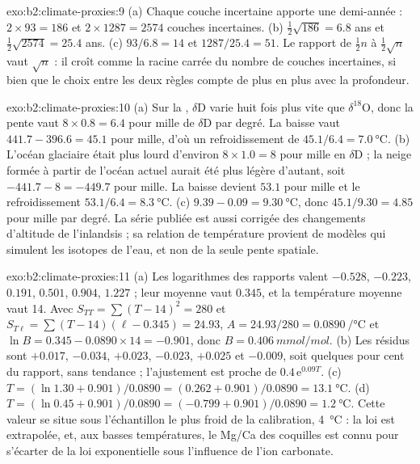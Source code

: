 \begin{solution}{exo:b2:climate-proxies:9}
(a) Chaque couche incertaine apporte une demi-année : $2 \times 93 = 186$ et $2 \times 1287 = 2574$
couches incertaines. (b) $\frac12\sqrt{186} = 6.8$ ans et $\frac12\sqrt{2574} = 25.4$ ans.
(c) $93/6.8 = 14$ et $1287/25.4 = 51$. Le rapport de $\frac12 n$ à $\frac12\sqrt{n}$ vaut
$\sqrt{n}$ : il croît comme la racine carrée du nombre de couches incertaines, si bien que le choix entre les deux règles
compte de plus en plus avec la profondeur.
\end{solution}

\begin{solution}{exo:b2:climate-proxies:10}
(a) Sur la , $\delta$D varie huit fois plus vite que $\delta^{18}$O, donc la
pente vaut $8 \times 0.8 = 6.4$ pour mille de $\delta$D par degré. La baisse vaut $441.7 - 396.6 = 45.1$
pour mille, d'où un refroidissement de $45.1/6.4 = \qty{7.0}{\celsius}$. (b) L'océan glaciaire était
plus lourd d'environ $8 \times 1.0 = 8$ pour mille en $\delta$D ; la neige formée à partir de l'océan actuel aurait été
plus légère d'autant, soit $-441.7 - 8 = -449.7$ pour mille. La baisse devient $53.1$ pour mille et le refroidissement
$53.1/6.4 = \qty{8.3}{\celsius}$. (c) $9.39 - 0.09 = \qty{9.30}{\celsius}$, donc $45.1/9.30 = 4.85$
pour mille par degré. La série publiée est aussi corrigée des changements d'altitude de l'inlandsis ;
sa relation de température provient de modèles qui simulent les isotopes de l'eau,
et non de la seule pente spatiale.
\end{solution}

\begin{solution}{exo:b2:climate-proxies:11}
(a) Les logarithmes des rapports valent $-0.528$, $-0.223$, $0.191$, $0.501$, $0.904$, $1.227$ ; leur
moyenne vaut $0.345$, et la température moyenne vaut 14. Avec $S_{TT} = \sum (T - 14)^2 = 280$ et $S_{T\ell} =
\sum (T - 14)(\ell - 0.345) = 24.93$, $A = 24.93/280 = \qty{0.0890}{\per\celsius}$ et $\ln B =
0.345 - 0.0890 \times 14 = -0.901$, donc $B = \qty{0.406}{mmol/mol}$. (b) Les résidus sont
$+0.017$, $-0.034$, $+0.023$, $-0.023$, $+0.025$ et $-0.009$, soit quelques pour cent du rapport, sans
tendance ; l'ajustement est proche de $0.4\,\mathrm{e}^{0.09T}$. (c) $T = (\ln 1.30 + 0.901)/0.0890 = (0.262 +
0.901)/0.0890 = \qty{13.1}{\celsius}$. (d) $T = (\ln 0.45 + 0.901)/0.0890 = (-0.799 +
0.901)/0.0890 = \qty{1.2}{\celsius}$. Cette valeur se situe sous l'échantillon le plus froid de la calibration,
\qty{4}{\celsius} : la loi est extrapolée, et, aux basses températures, le Mg/Ca des coquilles est connu pour s'écarter
de la loi exponentielle sous l'influence de l'ion carbonate.
\end{solution}

